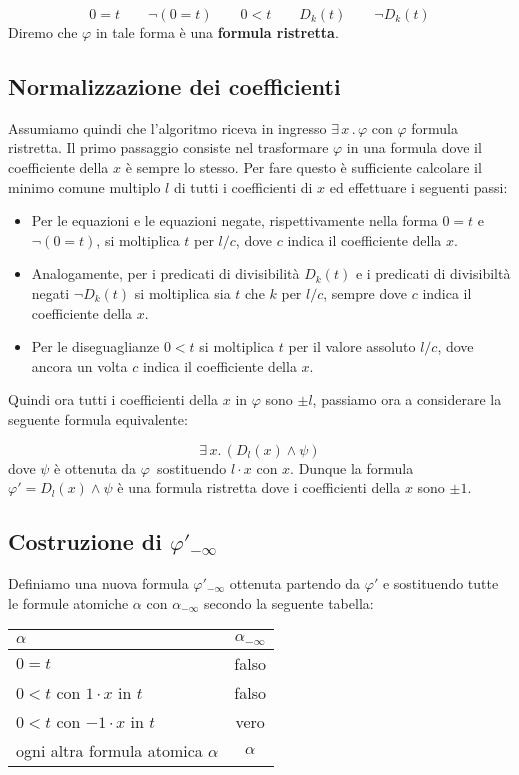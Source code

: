 \documentclass[11pt,letterpaper,twoside]{article}
\begin{document}
$$0=t \qquad \lnot(0=t) \qquad 0<t \qquad D_k(t) \qquad \lnot D_k(t)$$
Diremo che $\varphi$ in tale forma è una \textbf{formula ristretta}.

\subsection{Normalizzazione dei coefficienti}
Assumiamo quindi che l'algoritmo riceva in ingresso $\exists \, x \, . \,
\varphi$ con $\varphi$ formula ristretta. Il primo passaggio consiste nel
trasformare $\varphi$ in una formula dove il coefficiente della $x$ è sempre
lo stesso. Per fare questo è sufficiente calcolare il minimo comune multiplo
$l$ di tutti i coefficienti di $x$ ed effettuare i seguenti passi:
\begin{itemize}
  \item Per le equazioni e le equazioni negate, rispettivamente nella forma
    $0=t$ e $\lnot (0=t)$, si moltiplica $t$  per $l/c$, dove $c$ indica il
    coefficiente della $x$.
  \item Analogamente, per i predicati di divisibilit\`a $D_k(t)$ e i predicati
    di divisibilt\`a negati $\lnot D_k(t)$ si moltiplica sia $t$ che $k$ per
    $l/c$, sempre dove $c$ indica il coefficiente della $x$.
  \item Per le diseguaglianze $0<t$ si moltiplica $t$ per il valore assoluto
    $l/c$, dove ancora un volta $c$ indica il coefficiente della $x$.
  \end{itemize}

Quindi ora tutti i coefficienti della $x$ in $\varphi$ sono $\pm l$, passiamo
ora a considerare la seguente formula equivalente:

$$ \exists \, x . \, (D_l(x) \land \psi)  $$
dove $\psi$ è ottenuta da $\varphi$\ sostituendo $l \cdot x$ con $x$.
Dunque la formula $\varphi' = D_l(x) \land \psi$ è una formula ristretta dove
i coefficienti della $x$ sono $\pm 1$.

\subsection{Costruzione di $\varphi'_{- \infty}$}
Definiamo una nuova formula $\varphi'_{- \infty}$ ottenuta partendo da
$\varphi'$ e sostituendo tutte le formule atomiche $\alpha$ con $\alpha_{-
  \infty}$ secondo la seguente tabella:

\begin{center}
  \begin{tabular}{ l | c }
    $\alpha$ & $\alpha_{- \infty}$ \\ \hline
    $0=t$ & falso \\
    $0 < t$ con $1 \cdot x$ in $t$ & falso \\
    $0 < t$ con $-1 \cdot x$ in $t$ & vero \\
    ogni altra formula atomica $\alpha$ & $\alpha$ \\
  \end{tabular}
\end{center}
\end{document}

